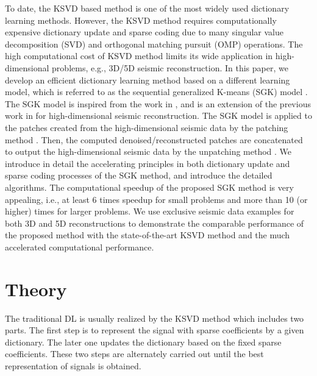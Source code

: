 



To date, the KSVD based method is one of the most widely used dictionary learning methods. However, the KSVD method requires computationally expensive dictionary update and sparse coding due to many singular value decomposition (SVD) and orthogonal matching pursuit (OMP) operations. The high computational cost of KSVD method limits its wide application in high-dimensional problems, e.g., 3D/5D seismic reconstruction. In this paper, we develop an efficient dictionary learning method based on a different learning model, which is referred to as the sequential generalized K-means (SGK) model \cite{sgk2013,yangkang2020sgk}. The SGK model is inspired from the work in \cite{sgk2013}, and is an extension of the previous work in \cite{yangkang2020sgk} for high-dimensional seismic reconstruction. The SGK model is applied to the patches created from the high-dimensional seismic data by the patching method \cite{wanghang2020}. Then, the computed denoised/reconstructed patches are concatenated to output the high-dimensional seismic data by the unpatching method \cite{wanghang2020}. We introduce in detail the accelerating principles in both dictionary update and sparse coding processes of the SGK method, and introduce the detailed algorithms. The computational speedup of the proposed SGK method is very appealing, i.e., at least 6 times speedup for small problems and more than 10 (or higher) times for larger problems. We use exclusive seismic data examples for both 3D and 5D reconstructions to demonstrate the comparable performance of the proposed method with the state-of-the-art KSVD method and the much accelerated computational performance. 


\section{Theory}
The traditional DL is usually realized by the KSVD method which includes two parts. The first step is to represent the signal with sparse coefficients by a given dictionary. The later one updates the dictionary based on the fixed sparse coefficients. These two steps are alternately carried out until the best representation of signals is obtained.

